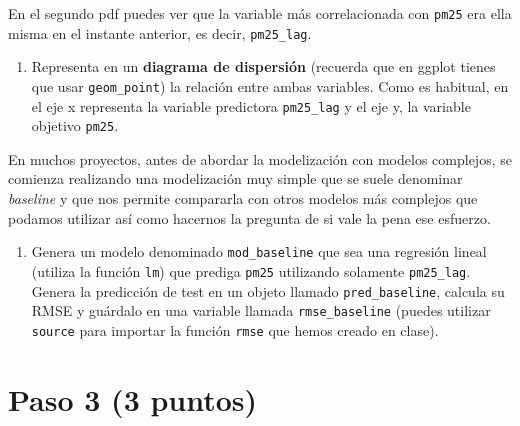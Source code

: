 \documentclass[]{article}
\providecommand{\tightlist}{%
  \setlength{\itemsep}{0pt}\setlength{\parskip}{0pt}}
\begin{document}
En el segundo pdf puedes ver que la variable más correlacionada con
\texttt{pm25} era ella misma en el instante anterior, es decir,
\texttt{pm25\_lag}.

\begin{enumerate}
\def\labelenumi{\arabic{enumi}.}
\tightlist
\item
  Representa en un \textbf{diagrama de dispersión} (recuerda que en
  ggplot tienes que usar \texttt{geom\_point}) la relación entre ambas
  variables. Como es habitual, en el eje x representa la variable
  predictora \texttt{pm25\_lag} y el eje y, la variable objetivo
  \texttt{pm25}.
\end{enumerate}

En muchos proyectos, antes de abordar la modelización con modelos
complejos, se comienza realizando una modelización muy simple que se
suele denominar \emph{baseline} y que nos permite compararla con otros
modelos más complejos que podamos utilizar así como hacernos la pregunta
de si vale la pena ese esfuerzo.

\begin{enumerate}
\def\labelenumi{\arabic{enumi}.}
\setcounter{enumi}{1}
\tightlist
\item
  Genera un modelo denominado \texttt{mod\_baseline} que sea una
  regresión lineal (utiliza la función \texttt{lm}) que prediga
  \texttt{pm25} utilizando solamente \texttt{pm25\_lag}. Genera la
  predicción de test en un objeto llamado \texttt{pred\_baseline},
  calcula su RMSE y guárdalo en una variable llamada
  \texttt{rmse\_baseline} (puedes utilizar \texttt{source} para importar
  la función \texttt{rmse} que hemos creado en clase).
\end{enumerate}

\hypertarget{paso-3-3-puntos}{%
\section{Paso 3 (3 puntos)}\label{paso-3-3-puntos}}
\end{document}
